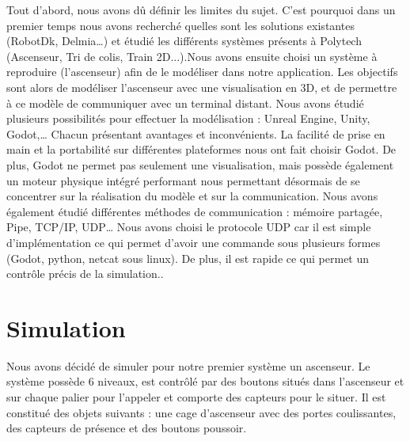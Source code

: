 \documentclass[12pt]{article}
\begin{document}
Tout d’abord, nous avons dû définir les limites du sujet. C’est pourquoi dans un premier temps nous avons recherché quelles sont les solutions existantes (RobotDk, Delmia…)  et étudié les différents systèmes présents à Polytech (Ascenseur, Tri de colis, Train 2D...).Nous avons ensuite choisi un système à reproduire (l’ascenseur) afin de le modéliser dans notre application.
\newline
Les objectifs sont alors de modéliser l’ascenseur avec une visualisation en 3D, et de permettre à ce modèle de communiquer avec un terminal distant.
\newline
\newline
Nous avons étudié plusieurs possibilités pour effectuer la modélisation : Unreal Engine, Unity, Godot,… Chacun présentant avantages et inconvénients.
La facilité de prise en main et la portabilité sur différentes plateformes nous ont fait choisir Godot. De plus, Godot ne permet pas seulement une visualisation, mais possède également un moteur physique intégré performant nous permettant désormais de se concentrer sur la réalisation du modèle et sur la communication.
\newline
\newline
Nous avons également étudié différentes méthodes de communication : mémoire partagée, Pipe, TCP/IP, UDP… 
Nous avons choisi le protocole UDP car il est simple d’implémentation ce qui permet d’avoir une commande sous plusieurs formes (Godot, python, netcat sous linux). De plus, il est rapide ce qui permet un contrôle précis de la simulation.. 
\newpage

\section{Simulation}
Nous avons décidé de simuler pour notre premier système un ascenseur. Le système possède 6 niveaux, est contrôlé par des boutons situés dans l’ascenseur et sur chaque palier pour l’appeler et comporte des capteurs pour le situer. Il est constitué des objets suivants : une cage d’ascenseur avec des portes coulissantes, des capteurs de présence et des boutons poussoir.
\end{document}
